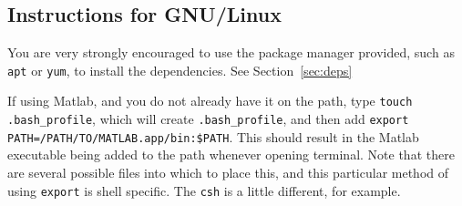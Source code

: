 
\subsection{Instructions for GNU/Linux}

You are very strongly encouraged to use the package manager provided, such as {\tt apt} or {\tt yum}, to install the dependencies.  See Section~\ref{sec:deps}

If using Matlab, and you do not already have it on the path, type \texttt{touch .bash\_profile}, which will create \texttt{.bash\_profile}, and then add \texttt{export PATH=/PATH/TO/MATLAB.app/bin:\$PATH}. This should result in the Matlab executable being added to the path whenever opening terminal.  Note that there are several possible files into which to place this, and this particular method of using {\tt export} is shell specific.  The {\tt csh} is a little different, for example.